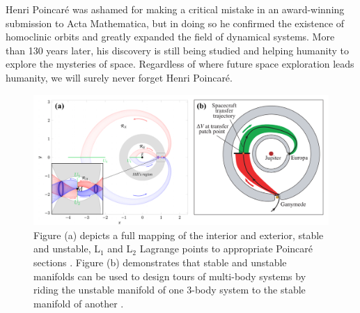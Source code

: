 \documentclass[11pt]{article} %
\begin{document}
Henri Poincaré was ashamed for making a critical mistake in an award-winning submission to Acta Mathematica, but in doing so he confirmed the existence of homoclinic orbits and greatly expanded the field of dynamical systems. More than 130 years later, his discovery is still being studied and helping humanity to explore the mysteries of space. Regardless of where future space exploration leads humanity, we will surely never forget Henri Poincaré.

\begin{figure}[H]
    \centering
    \includegraphics[width=\textwidth]{conc_pic.png}
    \caption{Figure (a) depicts a full mapping of the interior and exterior, stable and unstable, L$_1$ and L$_2$ Lagrange points to appropriate Poincar\'{e} sections \cite{KoonLoMarsdenRoss2011}. Figure (b) demonstrates that stable and unstable manifolds can be used to design tours of multi-body systems by riding the unstable manifold of one 3-body system to the stable manifold of another \cite{Gomez2004}.}
    \label{fig:conc_pic}
\end{figure}
\newpage


\end{document}
